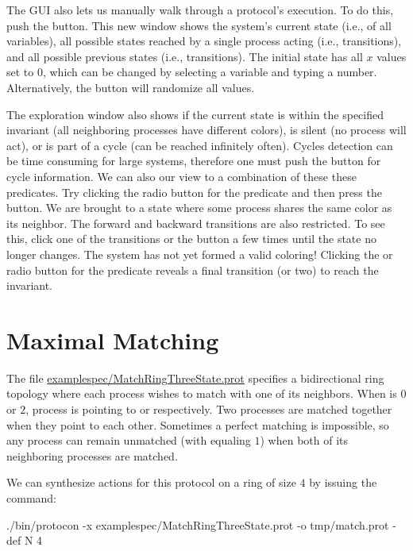 The GUI also lets us manually walk through a protocol's execution.
To do this, push the  button.
This new window shows the system's current state (i.e.,  of all variables), all possible states reached by a single process acting (i.e.,  transitions), and all possible previous states (i.e.,  transitions).
The initial state has all $x$ values set to $0$, which can be changed by selecting a variable and typing a number.
Alternatively, the  button will randomize all values.

The exploration window also shows if the current state is within the specified invariant (all neighboring processes have different colors), is silent (no process will act), or is part of a cycle (can be reached infinitely often).
Cycles detection can be time consuming for large systems, therefore one must push the  button for cycle information.
We can also  our view to a combination of these these predicates.
Try clicking the  radio button for the  predicate and then press the  button.
We are brought to a state where some process shares the same color as its neighbor.
The forward and backward transitions are also restricted.
To see this, click one of the  transitions or the  button a few times until the state no longer changes.
The system has not yet formed a valid coloring!
Clicking the  or  radio button for the  predicate reveals a final transition (or two) to reach the invariant.


\section{Maximal Matching}

The file \url{examplespec/MatchRingThreeState.prot} specifies a bidirectional ring topology where each process wishes to match with one of its neighbors.
When  is $0$ or $2$, process  is pointing to  or  respectively.
Two processes are matched together when they point to each other.
Sometimes a perfect matching is impossible, so any process  can remain unmatched (with  equaling $1$) when both of its neighboring processes are matched.

We can synthesize actions for this protocol on a ring of size $4$ by issuing the command:
\begin{code}
./bin/protocon -x examplespec/MatchRingThreeState.prot -o tmp/match.prot -def N 4
\end{code}

